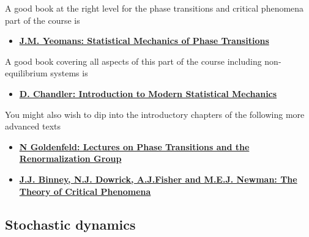 \documentclass[
  letterpaper,
  DIV=11,
  numbers=noendperiod]{scrreprt}
\providecommand{\tightlist}{%
  \setlength{\itemsep}{0pt}\setlength{\parskip}{0pt}}
\begin{document}
A good book at the right level for the phase transitions and critical
phenomena part of the course is

\begin{itemize}
\tightlist
\item
  \textbf{\href{https://bris.on.worldcat.org/search/detail/24699159?queryString=yeomans\%20statistical&clusterResults=true&stickyFacetsChecked=true&groupVariantRecords=false&newsArticles=off&bookReviews=off}{J.M.
  Yeomans: Statistical Mechanics of Phase Transitions}}
\end{itemize}

A good book covering all aspects of this part of the course including
non-equilibrium systems is

\begin{itemize}
\tightlist
\item
  \textbf{\href{https://bris.on.worldcat.org/search/detail/941821555?queryString=chandler\%20statistical&clusterResults=true&stickyFacetsChecked=true&groupVariantRecords=false&newsArticles=off&bookReviews=off}{D.
  Chandler: Introduction to Modern Statistical Mechanics}}
\end{itemize}

You might also wish to dip into the introductory chapters of the
following more advanced texts

\begin{itemize}
\item
  \textbf{\href{https://bris.on.worldcat.org/search/detail/25914535?queryString=Lectures\%20on\%20Phase\%20Transitions\%20and\%20the\%20Renormalization\%20Group&clusterResults=true&stickyFacetsChecked=true&groupVariantRecords=false&newsArticles=off&bookReviews=off}{N
  Goldenfeld: Lectures on Phase Transitions and the Renormalization
  Group}}
\item
  \textbf{\href{https://bris.on.worldcat.org/search/detail/861559276?queryString=\%20The\%20Theory\%20of\%20Critical\%20Phenomena&clusterResults=true&stickyFacetsChecked=true&groupVariantRecords=false&newsArticles=off&bookReviews=off}{J.J.
  Binney, N.J. Dowrick, A.J.Fisher and M.E.J. Newman: The Theory of
  Critical Phenomena}}
\end{itemize}

\subsection*{Stochastic dynamics}\label{stochastic-dynamics}
\end{document}
